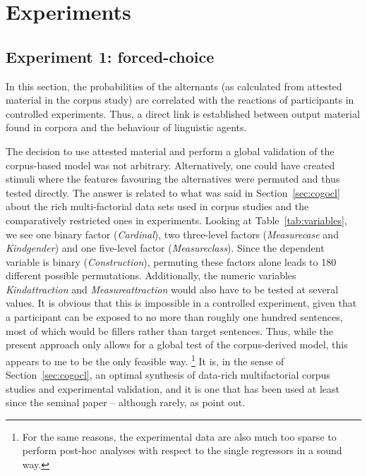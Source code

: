 \section{Experiments}
\label{sec:experimental}

\subsection{Experiment 1: forced-choice}
\label{sec:exp:fc}

In this section, the probabilities of the alternants (as calculated from attested material in the corpus study) are correlated with the reactions of participants in controlled experiments.
Thus, a direct link is established between output material found in corpora and the behaviour of linguistic agents.

The decision to use attested material and perform a global validation of the corpus-based model was not arbitrary.
Alternatively, one could have created stimuli where the features favouring the alternatives were permuted and thus tested directly.
The answer is related to what was said in Section~\ref{sec:cogocl} about the rich multi-factorial data sets used in corpus studies and the comparatively restricted ones in experiments.
Looking at Table~\ref{tab:variables}, we see one binary factor (\textit{Cardinal}), two three-level factors (\textit{Measurecase} and \textit{Kindgender}) and one five-level factor (\textit{Measureclass}).
Since the dependent variable is binary (\textit{Construction}), permuting these factors alone leads to 180 different possible permutations.
Additionally, the numeric variables \textit{Kindattraction} and \textit{Measureattraction} would also have to be tested at several values.
It is obvious that this is impossible in a controlled experiment, given that a participant can be exposed to no more than roughly one hundred sentences, most of which would be fillers rather than target sentences.
Thus, while the present approach only allows for a global test of the corpus-derived model, this appears to me to be the only feasible way.%
\footnote{For the same reasons, the experimental data are also much too sparse to perform post-hoc analyses with respect to the single regressors in a sound way.}
It is, in the sense of Section~\ref{sec:cogocl}, an optimal synthesis of data-rich multifactorial corpus studies and experimental validation, and it is one that has been used at least since the seminal \citet{BresnanEa2007} paper -- although rarely, as \citet[3--4]{DivjakEa2016a} point out.

